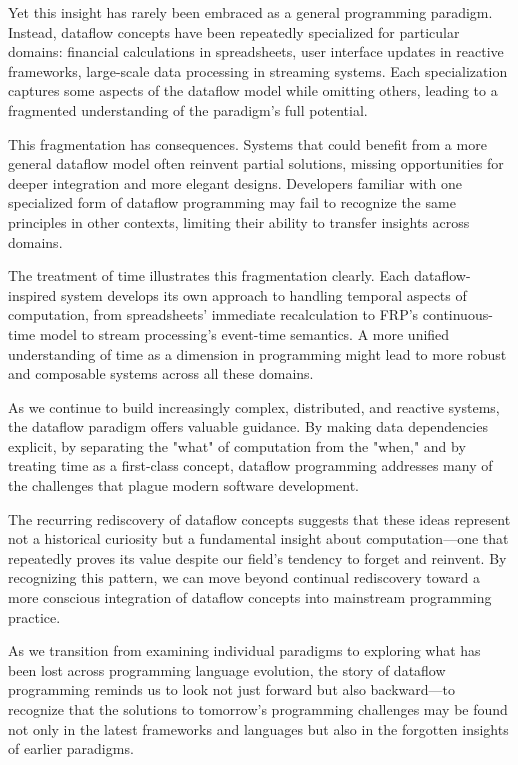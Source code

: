 \documentclass[11pt]{article}
\begin{document}
Yet this insight has rarely been embraced as a general programming paradigm. Instead, dataflow concepts have been repeatedly specialized for particular domains: financial calculations in spreadsheets, user interface updates in reactive frameworks, large-scale data processing in streaming systems. Each specialization captures some aspects of the dataflow model while omitting others, leading to a fragmented understanding of the paradigm's full potential.

This fragmentation has consequences. Systems that could benefit from a more general dataflow model often reinvent partial solutions, missing opportunities for deeper integration and more elegant designs. Developers familiar with one specialized form of dataflow programming may fail to recognize the same principles in other contexts, limiting their ability to transfer insights across domains.

The treatment of time illustrates this fragmentation clearly. Each dataflow-inspired system develops its own approach to handling temporal aspects of computation, from spreadsheets' immediate recalculation to FRP's continuous-time model to stream processing's event-time semantics. A more unified understanding of time as a dimension in programming might lead to more robust and composable systems across all these domains.

As we continue to build increasingly complex, distributed, and reactive systems, the dataflow paradigm offers valuable guidance. By making data dependencies explicit, by separating the "what" of computation from the "when," and by treating time as a first-class concept, dataflow programming addresses many of the challenges that plague modern software development.

The recurring rediscovery of dataflow concepts suggests that these ideas represent not a historical curiosity but a fundamental insight about computation—one that repeatedly proves its value despite our field's tendency to forget and reinvent. By recognizing this pattern, we can move beyond continual rediscovery toward a more conscious integration of dataflow concepts into mainstream programming practice.

As we transition from examining individual paradigms to exploring what has been lost across programming language evolution, the story of dataflow programming reminds us to look not just forward but also backward—to recognize that the solutions to tomorrow's programming challenges may be found not only in the latest frameworks and languages but also in the forgotten insights of earlier paradigms.
\end{document}
